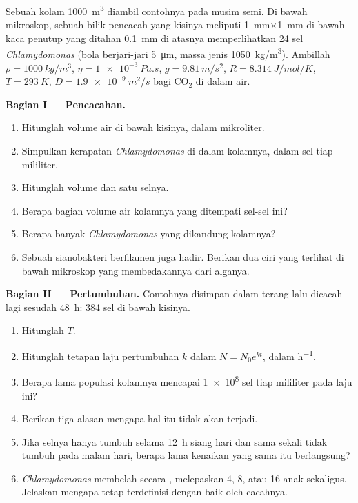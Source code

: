 \begin{problem}
\label{pb:b2:unicellular-diversity:1}
Sebuah kolam \qty{1000}{m^3} diambil contohnya pada musim semi. Di bawah
mikroskop, sebuah bilik pencacah yang kisinya meliputi
\qty{1}{mm}$\times$\qty{1}{mm}
di bawah kaca penutup yang ditahan \qty{0.1}{mm} di atasnya memperlihatkan
24 sel \emph{Chlamydomonas} (bola berjari-jari \qty{5}{\micro m},
massa jenis \qty{1050}{kg/m^3}). Ambillah $\rho = \qty{1000}{kg/m^3}$,
$\eta = \qty{1e-3}{Pa.s}$, $g = \qty{9.81}{m/s^2}$, $R =
\qty{8.314}{J/mol/K}$, $T = \qty{293}{K}$, $D = \qty{1.9e-9}{m^2/s}$
bagi $\mathrm{CO_2}$ di dalam air.

\medskip
\noindent\textbf{Bagian I --- Pencacahan.}
\begin{enumerate}
  \item Hitunglah volume air di bawah kisinya, dalam mikroliter.
  \item Simpulkan kerapatan \emph{Chlamydomonas} di dalam kolamnya,
        dalam sel tiap mililiter.
  \item Hitunglah volume dan  satu
        selnya.
  \item Berapa bagian volume air kolamnya yang ditempati sel-sel ini?
  \item Berapa banyak \emph{Chlamydomonas} yang dikandung kolamnya?
  \item Sebuah sianobakteri berfilamen juga hadir. Berikan dua ciri
        yang terlihat di bawah mikroskop yang membedakannya dari
        alganya.
\end{enumerate}

\medskip
\noindent\textbf{Bagian II --- Pertumbuhan.}
Contohnya disimpan dalam terang lalu dicacah lagi sesudah \qty{48}{h}:
\num{384} sel di bawah kisinya.
\begin{enumerate}[resume]
  \item Hitunglah  $T$.
  \item Hitunglah tetapan laju pertumbuhan $k$ dalam $N = N_0 e^{kt}$,
        dalam \unit{h^{-1}}.
  \item Berapa lama populasi kolamnya mencapai \qty{1e8}{} sel tiap
        mililiter pada laju ini?
  \item Berikan tiga alasan mengapa hal itu tidak akan terjadi.
  \item Jika selnya hanya tumbuh selama \qty{12}{h} siang hari dan sama
        sekali tidak tumbuh pada malam hari, berapa lama kenaikan yang
        sama itu berlangsung?
  \item \emph{Chlamydomonas} membelah secara , melepaskan
        4, 8, atau 16 anak sekaligus. Jelaskan mengapa 
        tetap terdefinisi dengan baik oleh cacahnya.
\end{enumerate}


\end{problem}

